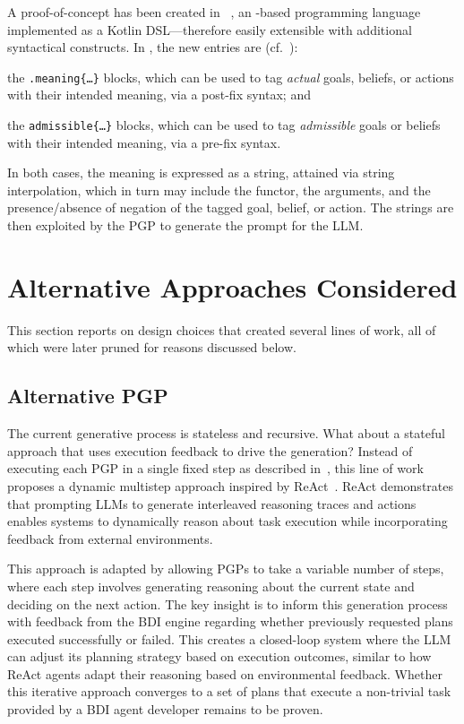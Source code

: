 \documentclass[12pt,a4paper,openright,twoside]{book}
\begin{document}
A proof-of-concept has been created in \jakta{}~\cite{JaktaSNCS2024}, an \agentspeak{}-based programming language implemented as a Kotlin \ac{DSL}---therefore easily extensible with additional syntactical constructs.
%
In \jakta{}, the new entries are (cf.~):
\begin{inlinelist}
    \item the \texttt{.meaning\{\ldots\}} blocks, which can be used to tag \emph{actual} goals, beliefs, or actions with their intended meaning, via a post-fix syntax; and
    \item the \texttt{admissible\{\ldots\}} blocks, which can be used to tag \emph{admissible} goals or beliefs with their intended meaning, via a pre-fix syntax.
\end{inlinelist}
%
In both cases, the meaning is expressed as a string, attained via string interpolation, which in turn may include the functor, the arguments, and the presence/absence of negation of the tagged goal, belief, or action.
%
The strings are then exploited by the \ac{PGP} to generate the prompt for the \ac{LLM}.

\section{Alternative Approaches Considered}

This section reports on design choices that created several lines of work, all of which were later pruned for reasons discussed below.

\subsection{Alternative PGP}


The current generative process is stateless and recursive. What about a stateful approach that uses execution feedback to drive the generation?
%
Instead of executing each \ac{PGP} in a single fixed step as described in~, this line of work proposes a dynamic multistep approach inspired by \ac{ReAct}~\cite{YaoZYDSN023}.
%
\ac{ReAct} demonstrates that prompting \acp{LLM} to generate interleaved reasoning traces and actions enables systems to dynamically reason about task execution while incorporating feedback from external environments.

This approach is adapted by allowing \acp{PGP} to take a variable number of steps, where each step involves generating reasoning about the current state and deciding on the next action. 
%
The key insight is to inform this generation process with feedback from the \ac{BDI} engine regarding whether previously requested plans executed successfully or failed. 
%
This creates a closed-loop system where the \ac{LLM} can adjust its planning strategy based on execution outcomes, similar to how \ac{ReAct} agents adapt their reasoning based on environmental feedback.
%
Whether this iterative approach converges to a set of plans that execute a non-trivial task provided by a \ac{BDI} agent developer remains to be proven.
\end{document}
